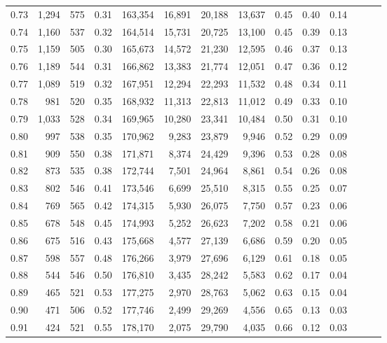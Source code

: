 \begin{tabular}{rrrrrrrrrrrrrr}
0.73 &  1,294 &  575 &  0.31 &  163,354 &   16,891 &  20,188 &  13,637 &  0.45 &  0.40 &      0.14 \\
0.74 &  1,160 &  537 &  0.32 &  164,514 &   15,731 &  20,725 &  13,100 &  0.45 &  0.39 &      0.13 \\
0.75 &  1,159 &  505 &  0.30 &  165,673 &   14,572 &  21,230 &  12,595 &  0.46 &  0.37 &      0.13 \\
0.76 &  1,189 &  544 &  0.31 &  166,862 &   13,383 &  21,774 &  12,051 &  0.47 &  0.36 &      0.12 \\
0.77 &  1,089 &  519 &  0.32 &  167,951 &   12,294 &  22,293 &  11,532 &  0.48 &  0.34 &      0.11 \\
0.78 &    981 &  520 &  0.35 &  168,932 &   11,313 &  22,813 &  11,012 &  0.49 &  0.33 &      0.10 \\
0.79 &  1,033 &  528 &  0.34 &  169,965 &   10,280 &  23,341 &  10,484 &  0.50 &  0.31 &      0.10 \\
0.80 &    997 &  538 &  0.35 &  170,962 &    9,283 &  23,879 &   9,946 &  0.52 &  0.29 &      0.09 \\
0.81 &    909 &  550 &  0.38 &  171,871 &    8,374 &  24,429 &   9,396 &  0.53 &  0.28 &      0.08 \\
0.82 &    873 &  535 &  0.38 &  172,744 &    7,501 &  24,964 &   8,861 &  0.54 &  0.26 &      0.08 \\
0.83 &    802 &  546 &  0.41 &  173,546 &    6,699 &  25,510 &   8,315 &  0.55 &  0.25 &      0.07 \\
0.84 &    769 &  565 &  0.42 &  174,315 &    5,930 &  26,075 &   7,750 &  0.57 &  0.23 &      0.06 \\
0.85 &    678 &  548 &  0.45 &  174,993 &    5,252 &  26,623 &   7,202 &  0.58 &  0.21 &      0.06 \\
0.86 &    675 &  516 &  0.43 &  175,668 &    4,577 &  27,139 &   6,686 &  0.59 &  0.20 &      0.05 \\
0.87 &    598 &  557 &  0.48 &  176,266 &    3,979 &  27,696 &   6,129 &  0.61 &  0.18 &      0.05 \\
0.88 &    544 &  546 &  0.50 &  176,810 &    3,435 &  28,242 &   5,583 &  0.62 &  0.17 &      0.04 \\
0.89 &    465 &  521 &  0.53 &  177,275 &    2,970 &  28,763 &   5,062 &  0.63 &  0.15 &      0.04 \\
0.90 &    471 &  506 &  0.52 &  177,746 &    2,499 &  29,269 &   4,556 &  0.65 &  0.13 &      0.03 \\
0.91 &    424 &  521 &  0.55 &  178,170 &    2,075 &  29,790 &   4,035 &  0.66 &  0.12 &      0.03 \\

\end{tabular}
